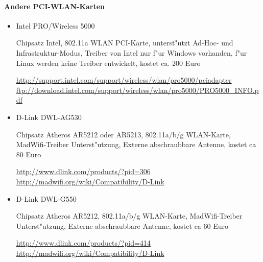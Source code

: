 \paragraph{Andere PCI-WLAN-Karten}

\begin{itemize}

\item Intel PRO/Wireless 5000

Chipsatz Intel,
802.11a WLAN PCI-Karte, unterst"utzt Ad-Hoc- und Infrastruktur-Modus,
Treiber von Intel nur f"ur Windows vorhanden, f"ur Linux werden keine
Treiber entwickelt, kostet ca. 200 Euro

\url{http://support.intel.com/support/wireless/wlan/pro5000/pciadapter}\\
\url{ftp://download.intel.com/support/wireless/wlan/pro5000/PRO5000_INFO.pdf}

\item D-Link DWL-AG530

Chipsatz Atheros AR5212 oder AR5213,
802.11a/b/g WLAN-Karte,
MadWifi-Treiber Unterst"utzung,
Externe abschraubbare Antenne, kostet ca 80 Euro

\url{http://www.dlink.com/products/?pid=306}\\
\url{http://madwifi.org/wiki/Compatibility/D-Link}

\item D-Link DWL-G550

Chipsatz Atheros AR5212,
802.11a/b/g WLAN-Karte,
MadWifi-Treiber Unterst"utzung,
Externe abschraubbare Antenne, kostet ca 60 Euro

\url{http://www.dlink.com/products/?pid=414}\\
\url{http://madwifi.org/wiki/Compatibility/D-Link}

\end{itemize}
